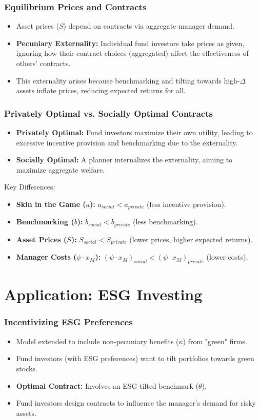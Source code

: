 \documentclass{beamer} %
\begin{document}
	\begin{frame}
		\frametitle{Equilibrium Prices and Contracts}
		\begin{itemize}
			\item Asset prices ($S$) depend on contracts via aggregate manager demand.
			\item \textbf{Pecuniary Externality:} Individual fund investors take prices as given, ignoring how their contract choices (aggregated) affect the effectiveness of others' contracts.
			\item This externality arises because benchmarking and tilting towards high-$\Delta$ assets inflate prices, reducing expected returns for all.
		\end{itemize}
	\end{frame}
	
	\begin{frame}
		\frametitle{Privately Optimal vs. Socially Optimal Contracts}
		\begin{itemize}
			\item \textbf{Privately Optimal:} Fund investors maximize their own utility, leading to excessive incentive provision and benchmarking due to the externality.
			\item \textbf{Socially Optimal:} A planner internalizes the externality, aiming to maximize aggregate welfare.
		\end{itemize}
		\begin{block}{Key Differences:}
			\begin{itemize}
				\item \textbf{Skin in the Game ($a$):} $a_{social} < a_{private}$ (less incentive provision).
				\item \textbf{Benchmarking ($b$):} $b_{social} < b_{private}$ (less benchmarking).
				\item \textbf{Asset Prices ($S$):} $S_{social} < S_{private}$ (lower prices, higher expected returns).
				\item \textbf{Manager Costs ($\psi \cdot x_M$):} $(\psi \cdot x_M)_{social} < (\psi \cdot x_M)_{private}$ (lower costs).
			\end{itemize}
		\end{block}
	\end{frame}
	
	\section{Application: ESG Investing}
	\begin{frame}
		\frametitle{Incentivizing ESG Preferences}
		\begin{itemize}
			\item Model extended to include non-pecuniary benefits ($\kappa$) from "green" firms.
			\item Fund investors (with ESG preferences) want to tilt portfolios towards green stocks.
			\item \textbf{Optimal Contract:} Involves an ESG-tilted benchmark ($\theta$).
			\item Fund investors design contracts to influence the manager's demand for risky assets.
		\end{itemize}
	\end{frame}
	
\end{document}
